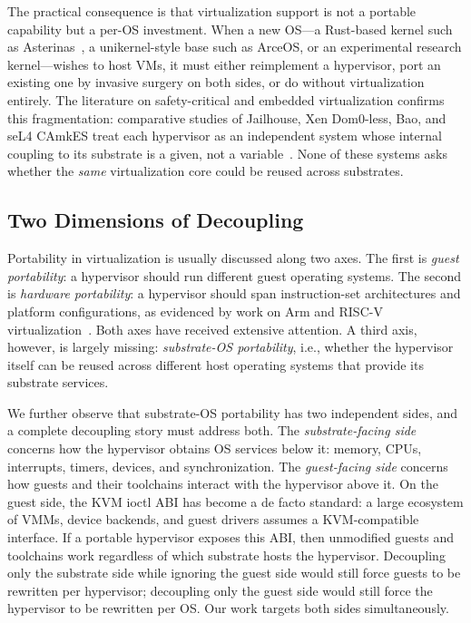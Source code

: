 The practical consequence is that virtualization support is not a portable
capability but a per-OS investment. When a new OS---a Rust-based kernel such as
Asterinas~\cite{peng2025asterinas, peng2024framekernel}, a unikernel-style base
such as ArceOS, or an experimental research kernel---wishes to host VMs, it must
either reimplement a hypervisor, port an existing one by invasive surgery on
both sides, or do without virtualization entirely. The literature on
safety-critical and embedded virtualization confirms this fragmentation:
comparative studies of Jailhouse, Xen Dom0-less, Bao, and seL4 CAmkES treat each
hypervisor as an independent system whose internal coupling to its substrate is
a given, not a variable~\cite{martins2020bao, lozano2023comprehensive}. None of
these systems asks whether the \emph{same} virtualization core could be reused
across substrates.

\subsection{Two Dimensions of Decoupling}

Portability in virtualization is usually discussed along two axes. The first is
\emph{guest portability}: a hypervisor should run different guest operating
systems. The second is \emph{hardware portability}: a hypervisor should span
instruction-set architectures and platform configurations, as evidenced by work
on Arm and RISC-V virtualization~\cite{sa2023cva6}. Both axes have received
extensive attention. A third axis, however, is largely missing:
\emph{substrate-OS portability}, i.e., whether the hypervisor itself can be
reused across different host operating systems that provide its substrate
services.

We further observe that substrate-OS portability has two independent sides, and
a complete decoupling story must address both. The \emph{substrate-facing side}
concerns how the hypervisor obtains OS services below it: memory, CPUs,
interrupts, timers, devices, and synchronization. The \emph{guest-facing side}
concerns how guests and their toolchains interact with the hypervisor above it.
On the guest side, the KVM ioctl ABI has become a de facto standard: a large
ecosystem of VMMs, device backends, and guest drivers assumes a KVM-compatible
interface. If a portable hypervisor exposes this ABI, then unmodified guests and
toolchains work regardless of which substrate hosts the hypervisor. Decoupling
only the substrate side while ignoring the guest side would still force guests
to be rewritten per hypervisor; decoupling only the guest side would still force
the hypervisor to be rewritten per OS. Our work targets both sides
simultaneously.

